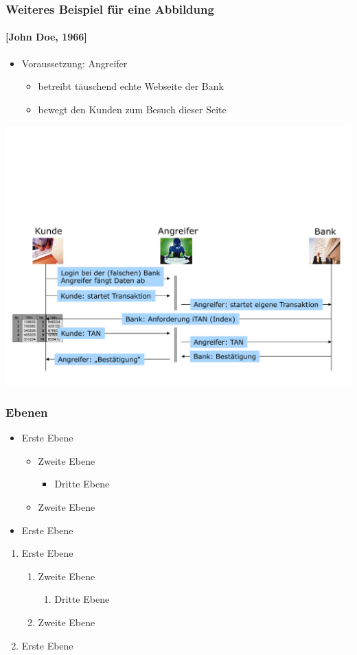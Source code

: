 \documentclass[t]{beamer}
\begin{document}
\begin{frame}
	\frametitle{Weiteres Beispiel für eine Abbildung}
	\framesubtitle{[John Doe, 1966] }
	\begin{itemize}
		\item Voraussetzung: {\color{black} Angreifer}
			\begin{itemize}
				\item betreibt täuschend echte Webseite der Bank
				\item bewegt den Kunden zum Besuch dieser Seite
			\end{itemize}
	\end{itemize}
	\vspace{\fill}
	\begin{center}
		\includegraphics[width=\textwidth]{pic/abbildung3.pdf}
	\end{center}
\end{frame}


\begin{frame}
	\frametitle{Ebenen}
	\begin{itemize}
		\item Erste Ebene
			\begin{itemize}
				\item Zweite Ebene
				\begin{itemize}
					\item Dritte Ebene
				\end{itemize}
				\item Zweite Ebene
			\end{itemize}
		\item Erste Ebene
	\end{itemize}
	\begin{enumerate}
		\item Erste Ebene
			\begin{enumerate}
				\item Zweite Ebene
				\begin{enumerate}
					\item Dritte Ebene
				\end{enumerate}
				\item Zweite Ebene
			\end{enumerate}
		\item Erste Ebene
	\end{enumerate}
\end{frame}
\end{document}
